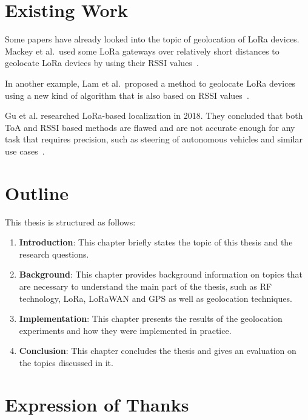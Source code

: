 \section{Existing Work}

Some papers have already looked into the topic of geolocation of \ac{LoRa} devices.
Mackey et al.~used some \ac{LoRa} gateways over relatively short distances to geolocate \ac{LoRa} devices by using their \ac{RSSI} values~\cite{mackey_lora-based_2019}.

In another example, Lam et al.~proposed a method to geolocate \ac{LoRa} devices using a new kind of algorithm that is also based on \ac{RSSI} values~\cite{lam_new_2018}.

Gu et al. researched \ac{LoRa}-based localization in 2018.
They concluded that both \ac{ToA} and \ac{RSSI} based methods are flawed and are not accurate enough for any task that requires precision, such as steering of autonomous vehicles and similar use cases~\cite{gu_lora-based_2018}.

\section{Outline}

This thesis is structured as follows:

\begin{enumerate}
      \item \textbf{Introduction}:
            This chapter briefly states the topic of this thesis and the research questions.
      \item \textbf{Background}:
            This chapter provides background information on topics that are necessary to understand the main part of the thesis, such as \ac{RF} technology, \ac{LoRa}, \ac{LoRaWAN} and \ac{GPS} as well as geolocation techniques.
      \item \textbf{Implementation}:
            This chapter presents the results of the geolocation experiments and how they were implemented in practice.
      \item \textbf{Conclusion}:
            This chapter concludes the thesis and gives an evaluation on the topics discussed in it.
\end{enumerate}


\section{Expression of Thanks}

